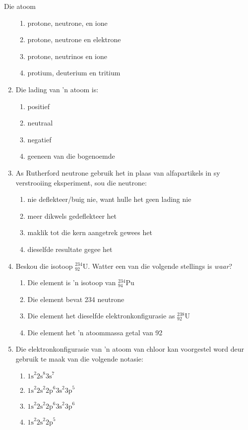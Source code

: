 \begin{eocexercises}{Die atoom}
\begin{enumerate}[noitemsep, label=\textbf{\arabic*}. ]
\begin{enumerate}[noitemsep, label=\textbf{\alph*}. ]
            \item protone, neutrone, en ione
\item protone, neutrone en elektrone
\item protone, neutrinos en ione
\item protium, deuterium en tritium
\end{enumerate}
                \item Die lading van 'n atoom is:
\begin{enumerate}[noitemsep, label=\textbf{\alph*}. ] 
            \item positief
\item neutraal
\item negatief
\item geeneen van die bogenoemde
\end{enumerate}
                \item As Rutherford neutrone gebruik het in plaas van alfapartikels in sy verstrooiing eksperiment, sou die neutrone:
\begin{enumerate}[noitemsep, label=\textbf{\alph*}. ] 
            \item nie deflekteer/buig nie, want hulle het geen lading nie
\item meer dikwels gedeflekteer het
\item maklik tot die kern aangetrek gewees het
\item dieselfde resultate gegee het
\end{enumerate}

\item Beskou die isotoop $_{92}^{234}\text{U}$. Watter een van die volgende stellings is \textsl{waar}?
\begin{enumerate}[noitemsep, label=\textbf{\alph*}. ] 
\item Die element is 'n isotoop van $_{94}^{234}\text{Pu}$
\item Die element bevat 234 neutrone
\item Die element het dieselfde elektronkonfigurasie as $_{92}^{238}\text{U}$
\item Die element het 'n atoommassa getal van 92
\end{enumerate}
\item Die elektronkonfigurasie van 'n atoom van chloor kan voorgestel word deur gebruik te maak van die volgende notasie:
\begin{enumerate}[noitemsep, label=\textbf{\alph*}. ] 
\item  ${1\text{s}}^{2}{2\text{s}}^{8}{3\text{s}}^{7}$
\item ${1\text{s}}^{2}{2\text{s}}^{2}{2\text{p}}^{6}{3\text{s}}^{2}{3\text{p}}^{5}$
\item ${1\text{s}}^{2}{2\text{s}}^{2}{2\text{p}}^{6}{3\text{s}}^{2}{3\text{p}}^{6}$
\item ${1\text{s}}^{2}{2\text{s}}^{2}{2\text{p}}^{5}$
\end{enumerate}
                

\end{enumerate}
\end{eocexercises}
